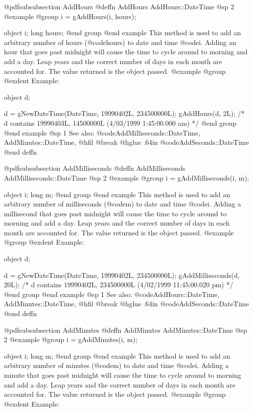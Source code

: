 @pdfsubsubsection {AddHours}
@deffn {AddHours} AddHours::DateTime
@sp 2
@example
@group
i = gAddHours(i, hours);

object  i;
long    hours;
@end group
@end example
This method is used to add an arbitrary number of hours (@code{hours}) to
date and time @code{i}.  Adding an hour that goes past midnight will cause the time
to cycle around to morning and add a day.  Leap years and the correct number of
days in each month are accounted for.  The value returned is the object passed.
@example
@group
@exdent Example:

object  d;

d = gNewDateTime(DateTime, 19990402L, 234500000L);
gAddHours(d, 2L);
/*  d contains 19990403L, 14500000L
    (4/03/1999 1:45:00.000 am) */
@end group
@end example
@sp 1
See also:  @code{AddMilliseconds::DateTime, AddMinutes::DateTime,}
@hfil @break @hglue .64in      @code{AddSeconds::DateTime}
@end deffn








@pdfsubsubsection {AddMilliseconds}
@deffn {AddMilliseconds} AddMilliseconds::DateTime
@sp 2
@example
@group
i = gAddMilliseconds(i, m);

object  i;
long    m;
@end group
@end example
This method is used to add an arbitrary number of milliseconds (@code{m}) to
date and time @code{i}.  Adding a millisecond that goes past midnight will cause
the time to cycle around to morning and add a day.  Leap years and the correct
number of days in each month are accounted for.  The value returned is the
object passed.
@example
@group
@exdent Example:

object  d;

d = gNewDateTime(DateTime, 19990402L, 234500000L);
gAddMilliseconds(d, 20L);
/*  d contains 19990402L, 234500000L
    (4/02/1999 11:45:00.020 pm) */
@end group
@end example
@sp 1
See also:  @code{AddHours::DateTime, AddMinutes::DateTime,}
@hfil @break @hglue .64in      @code{AddSeconds::DateTime}
@end deffn











@pdfsubsubsection {AddMinutes}
@deffn {AddMinutes} AddMinutes::DateTime
@sp 2
@example
@group
i = gAddMinutes(i, m);

object  i;
long    m;
@end group
@end example
This method is used to add an arbitrary number of minutes (@code{m}) to
date and time @code{i}.  Adding a minute that goes past midnight will cause the time
to cycle around to morning and add a day.  Leap years and the correct number of
days in each month are accounted for.  The value returned is the object passed.
@example
@group
@exdent Example:

